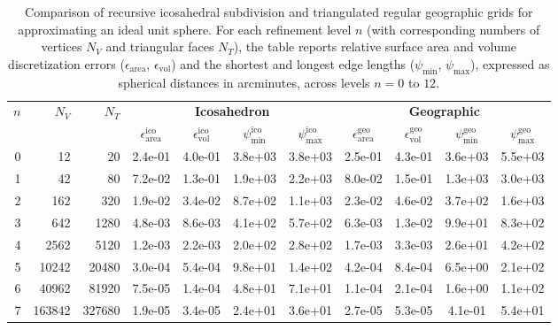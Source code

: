 \documentclass{seg}
\begin{document}
\clearpage
\begin{table}[h!]
\centering
\setlength{\tabcolsep}{4.8pt}
\caption{Comparison of recursive icosahedral subdivision and triangulated regular geographic grids for approximating an ideal unit sphere. For each refinement level $n$ (with corresponding numbers of vertices $N_V$ and triangular faces $N_T$), the table reports relative surface area and volume discretization errors ($\epsilon_{\mathrm{area}}$, $\epsilon_{\mathrm{vol}}$) and the shortest and longest edge lengths ($\psi_{\mathrm{min}}$, $\psi_{\mathrm{max}}$), expressed as spherical distances in arcminutes, across levels $n = 0$ to $12$.}
\label{tab:ico_geo_sphere}
\begin{tabular}{rrrcccccccc}
\toprule
\multirow{2}{*}{$n$} &
\multirow{2}{*}{$N_{V}$} &
\multirow{2}{*}{$N_{T}$} &
\multicolumn{4}{c}{\textbf{Icosahedron}} &
\multicolumn{4}{c}{\textbf{Geographic}} \\
\cmidrule(lr){4-7} \cmidrule(lr){8-11}
& & &
$\epsilon_{\mathrm{area}}^{\mathrm{ico}}$ &
$\epsilon_{\mathrm{vol}}^{\mathrm{ico}}$ &
$\psi_{\mathrm{min}}^{\mathrm{ico}}$ &
$\psi_{\mathrm{max}}^{\mathrm{ico}}$ &
$\epsilon_{\mathrm{area}}^{\mathrm{geo}}$ &
$\epsilon_{\mathrm{vol}}^{\mathrm{geo}}$ &
$\psi_{\mathrm{min}}^{\mathrm{geo}}$ &
$\psi_{\mathrm{max}}^{\mathrm{geo}}$ \\
\midrule
0   & 12          & 20         & 2.4e-01 & 4.0e-01 & 3.8e+03 & 3.8e+03 & 2.5e-01 & 4.3e-01 & 3.6e+03 & 5.5e+03 \\
1   & 42          & 80         & 7.2e-02 & 1.3e-01 & 1.9e+03 & 2.2e+03 & 8.0e-02 & 1.5e-01 & 1.3e+03 & 3.0e+03 \\
2   & 162         & 320        & 1.9e-02 & 3.4e-02 & 8.7e+02 & 1.1e+03 & 2.3e-02 & 4.6e-02 & 3.7e+02 & 1.6e+03 \\
3   & 642         & 1280       & 4.8e-03 & 8.6e-03 & 4.1e+02 & 5.7e+02 & 6.3e-03 & 1.3e-02 & 9.9e+01 & 8.3e+02 \\
4   & 2562        & 5120       & 1.2e-03 & 2.2e-03 & 2.0e+02 & 2.8e+02 & 1.7e-03 & 3.3e-03 & 2.6e+01 & 4.2e+02 \\
5   & 10242       & 20480      & 3.0e-04 & 5.4e-04 & 9.8e+01 & 1.4e+02 & 4.2e-04 & 8.4e-04 & 6.5e+00 & 2.1e+02 \\
6   & 40962       & 81920      & 7.5e-05 & 1.4e-04 & 4.8e+01 & 7.1e+01 & 1.1e-04 & 2.1e-04 & 1.6e+00 & 1.1e+02 \\
7   & 163842      & 327680     & 1.9e-05 & 3.4e-05 & 2.4e+01 & 3.6e+01 & 2.7e-05 & 5.3e-05 & 4.1e-01 & 5.4e+01 \\

\end{tabular}
\end{table}
\end{document}

